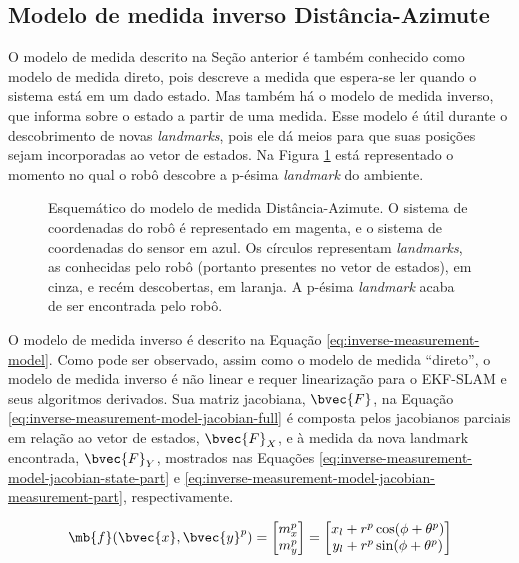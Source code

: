 \subsection{Modelo de medida inverso Distância-Azimute}
\label{sec:inverse-measurement-model}
O modelo de medida descrito na Seção anterior é também conhecido como modelo de medida direto, pois descreve a medida que espera-se ler quando o sistema está em um dado estado. Mas também há o modelo de medida inverso, que informa sobre o estado a partir de uma medida. Esse modelo é útil durante o descobrimento de novas \textit{landmarks}, pois ele dá meios para que suas posições sejam  incorporadas ao vetor de estados. Na Figura \ref{fig:range-bearing-inverse-model-schematic} está representado o momento no qual o robô descobre a p-ésima \textit{landmark} do ambiente.
\begin{figure}[h]
  
  \caption[Esquemático do modelo de medida Distância-Azimute]{Esquemático do modelo de medida Distância-Azimute. O sistema de coordenadas do robô é representado em magenta, e o sistema de coordenadas do sensor em azul. Os círculos representam \textit{landmarks}, as conhecidas pelo robô (portanto presentes no vetor de estados), em cinza, e recém descobertas, em laranja. A p-ésima \textit{landmark} acaba de ser encontrada pelo robô.}
  \label{fig:range-bearing-inverse-model-schematic}
\end{figure}

O modelo de medida inverso \invMeasurementModel{} é descrito na Equação \ref{eq:inverse-measurement-model}. Como pode ser observado, assim como o 
modelo de medida ``direto'', o modelo de medida inverso é não linear e requer linearização para o EKF-SLAM e seus 
algoritmos derivados. Sua matriz jacobiana, $\bvec{F}$, na Equação \ref{eq:inverse-measurement-model-jacobian-full} é composta pelos jacobianos 
parciais em relação ao vetor de estados, $\bvec{F}_X$, e à medida da nova 
landmark encontrada, $\bvec{F}_Y$, mostrados nas Equações \ref{eq:inverse-measurement-model-jacobian-state-part} e \ref{eq:inverse-measurement-model-jacobian-measurement-part}, respectivamente.

\begin{equation}
  \mb{f}(\bvec{x}, \bvec{y}^{p}) = 
    \begin{bmatrix}
        m_x^p \\
        m_y^p \\
    \end{bmatrix} =
    \begin{bmatrix}
        x_l + r^p \cos(\phi + \theta^p)\\
        y_l + r^p \sin(\phi + \theta^p) 
    \end{bmatrix}
    \label{eq:inverse-measurement-model}
\end{equation}

